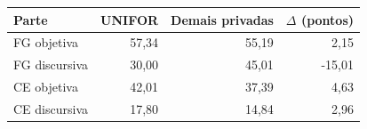 \begin{tabular}{lrrr}
\toprule
Parte & UNIFOR & Demais privadas & $\Delta$ (pontos) \\
\midrule
FG objetiva & 57,34 & 55,19 & 2,15 \\
FG discursiva & 30,00 & 45,01 & -15,01 \\
CE objetiva & 42,01 & 37,39 & 4,63 \\
CE discursiva & 17,80 & 14,84 & 2,96 \\
\bottomrule
\end{tabular}
